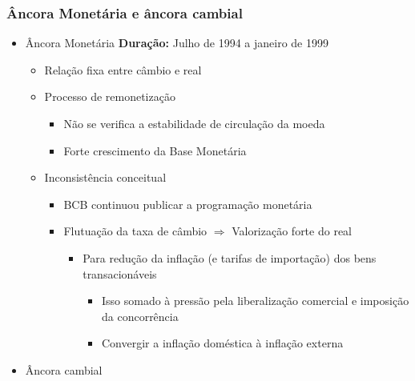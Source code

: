\documentclass[11pt]{article}
\begin{document}
\subsubsection*{Âncora Monetária e âncora cambial}
\label{sec:org4537881}
\begin{itemize}
\item Âncora Monetária
\label{sec:orgb955423}
\textbf{Duração:} Julho de 1994 a  janeiro de 1999

\begin{itemize}
\item Relação fixa entre câmbio e real
\item Processo de remonetização
\begin{itemize}
\item Não se verifica a estabilidade de circulação da moeda
\item Forte crescimento da Base Monetária
\end{itemize}
\item Inconsistência conceitual
\begin{itemize}
\item BCB continuou publicar a programação monetária
\item Flutuação da taxa de câmbio \(\Rightarrow\) Valorização forte do real
\begin{itemize}
\item Para redução da inflação (e tarifas de importação) dos bens transacionáveis
\begin{itemize}
\item Isso somado à pressão pela liberalização comercial e imposição da concorrência
\item Convergir a inflação doméstica à inflação externa
\end{itemize}
\end{itemize}
\end{itemize}
\end{itemize}
\item Âncora cambial
\label{sec:org8fa9f77}


\end{itemize}
\end{document}

